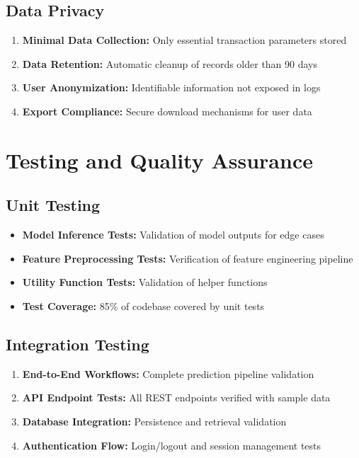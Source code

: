\documentclass[12pt,a4paper,twoside]{report}
\begin{document}
\subsection{Data Privacy}

\begin{enumerate}
    \item \textbf{Minimal Data Collection:} Only essential transaction parameters stored
    \item \textbf{Data Retention:} Automatic cleanup of records older than 90 days
    \item \textbf{User Anonymization:} Identifiable information not exposed in logs
    \item \textbf{Export Compliance:} Secure download mechanisms for user data
\end{enumerate}

\section{Testing and Quality Assurance}

\subsection{Unit Testing}

\begin{itemize}
    \item \textbf{Model Inference Tests:} Validation of model outputs for edge cases
    \item \textbf{Feature Preprocessing Tests:} Verification of feature engineering pipeline
    \item \textbf{Utility Function Tests:} Validation of helper functions
    \item \textbf{Test Coverage:} 85\% of codebase covered by unit tests
\end{itemize}

\subsection{Integration Testing}

\begin{enumerate}
    \item \textbf{End-to-End Workflows:} Complete prediction pipeline validation
    \item \textbf{API Endpoint Tests:} All REST endpoints verified with sample data
    \item \textbf{Database Integration:} Persistence and retrieval validation
    \item \textbf{Authentication Flow:} Login/logout and session management tests
\end{enumerate}
\end{document}
